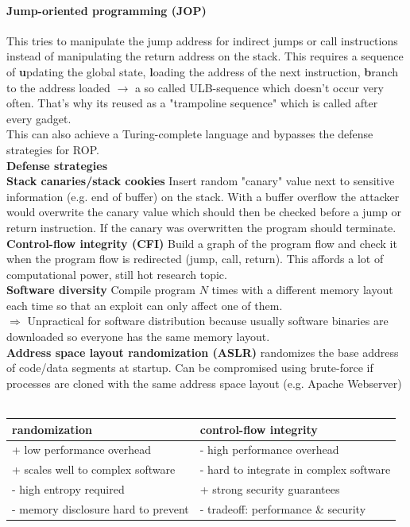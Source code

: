 \documentclass[12pt]{article}
\begin{document}
	\paragraph{Jump-oriented programming (JOP)} This tries to manipulate the jump address for indirect jumps or call instructions instead of manipulating the return address on the stack. This requires a sequence of \textbf{u}pdating the global state, \textbf{l}oading the address of the next instruction, \textbf{b}ranch to the address loaded $\rightarrow$ a so called ULB-sequence which doesn't occur very often. That's why its reused as a "trampoline sequence" which is called after every gadget.\\
	This can also achieve a Turing-complete language and bypasses the defense strategies for ROP.\\
	\textbf{Defense strategies}\\
	\textbf{Stack canaries/stack cookies} Insert random "canary" value next to sensitive information (e.g. end of buffer) on the stack. With a buffer overflow the attacker would overwrite the canary value which should then be checked before a jump or return instruction. If the canary was overwritten the program should terminate.\\
	\textbf{Control-flow integrity (CFI)} Build a graph of the program flow and check it when the program flow is redirected (jump, call, return). This affords a lot of computational power, still hot research topic.\\
	\textbf{Software diversity} Compile program $N$ times with a different memory layout each time so that an exploit can only affect one of them.\\
	$\Rightarrow$ Unpractical for software distribution because usually software binaries are downloaded so everyone has the same memory layout.\\
	\textbf{Address space layout randomization (ASLR)} randomizes the base address of code/data segments at startup. Can be compromised using brute-force if processes are cloned with the same address space layout (e.g. Apache Webserver)\\
	\\
	\begin{tabular}{|l|l|}
		\hline 
		\textbf{randomization} & \textbf{control-flow integrity} \\ 
		\hline 
		+ low performance overhead & - high performance overhead \\ 
		+ scales well to complex software & - hard to integrate in complex software \\ 
		- high entropy required & + strong security guarantees \\ 
		- memory disclosure hard to prevent & - tradeoff: performance \& security \\ 
		\hline 
	\end{tabular}
\end{document}
